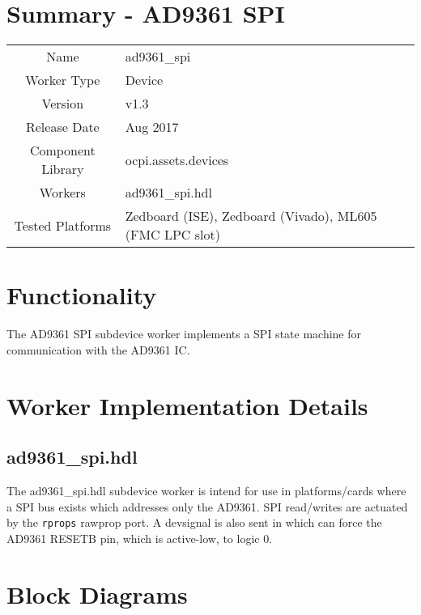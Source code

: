 \documentclass{article}
\author{} %
\date{Version \docVersion} %
\title{\docTitle}
\def\docVersion{1.3}
\def\devsignal{devsignal}
\def\comp{ad9361\_spi}
\def\Comp{AD9361 SPI}
\begin{document}
\section*{Summary - \Comp}
\begin{tabular}{|c|M{13.5cm}|}
	\hline
	                  &                  \\
	\hline
	Name              & \comp            \\
	\hline
	Worker Type       & Device           \\
	\hline
	Version           & v\docVersion{}   \\
	\hline
	Release Date      & Aug 2017         \\
	\hline
	Component Library & ocpi.assets.devices     \\
	\hline
	Workers           & \comp.hdl        \\
	\hline
	Tested Platforms  & Zedboard (ISE), Zedboard (Vivado), ML605 (FMC LPC slot) \\
	\hline
\end{tabular}
\section*{Functionality}
	The \Comp{} subdevice worker implements a SPI state machine for communication with the AD9361 IC\cite{ad9361}.
\section*{Worker Implementation Details}
\subsection*{\comp.hdl}
The \comp{}.hdl subdevice worker is intend for use in platforms/cards where a SPI bus exists which addresses only the AD9361. SPI read/writes are actuated by the \verb+rprops+ rawprop port. A \devsignal{} is also sent in which can force the AD9361 RESETB pin, which is active-low, to logic 0.
\section*{Block Diagrams}
\end{document}
